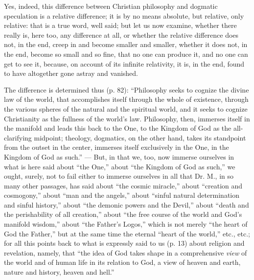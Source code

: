 \documentclass[12pt]{book}
\begin{document}
Yes, indeed, this difference between Christian philosophy and dogmatic speculation is a relative difference; it is by no means absolute, but relative, only relative: that is a true word, well said; but let us now examine, whether there really is, here too, any difference at all, or whether the relative difference does not, in the end, creep in and become smaller and smaller, whether it does not, in the end, become so small and so fine, that no one can produce it, and no one can get to see it, because, on account of its infinite relativity, it is, in the end, found to have altogether gone astray and vanished.

The difference is determined thus (p. 82): ``Philosophy seeks to cognize the divine law of the world, that
accomplishes itself through the whole of existence, through the various spheres of the natural and the spiritual world, and it seeks to cognize Christianity as the fullness of the world's law. Philosophy, then, immerses itself in the manifold and leads this back to the One, to the Kingdom of God as the all-clarifying midpoint; theology, dogmatics, on the other hand, takes its standpoint from the outset in the center, immerses itself exclusively in the One, in the Kingdom of God as such.'' --- But, in that we, too, now immerse ourselves in what is here said about ``the One,'' about ``the Kingdom of God as such,'' we ought, surely, not to fail either to immerse ourselves in all that Dr. M., in so many other passages, has said about ``the cosmic miracle,'' about ``creation and cosmogony,'' about ``man and the angels,'' about ``sinful natural determination and sinful history,'' about ``the demonic powers and the Devil,'' about ``death and the perishability of all creation,'' about ``the free course of the world and God's manifold wisdom,'' about ``the Father's Logos,'' which is not merely ``the heart of God the Father,'' but at the same time the eternal ``heart of the world,'' etc., etc.; for all this points back to what is expressly said to us (p. 13) about religion and revelation, namely, that ``the idea of God takes shape in a comprehensive \emph{view} of the world and of human life in its relation to God, a view of heaven and earth, nature and history, heaven and hell.''
\end{document}

